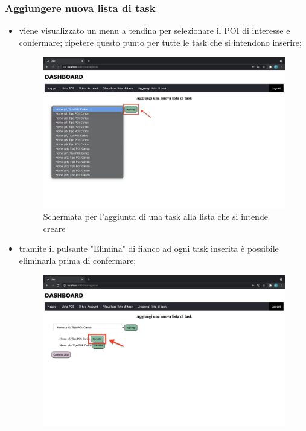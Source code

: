\subsubsection{Aggiungere nuova lista di task}
\begin{itemize}
    \item viene visualizzato un menu a tendina per selezionare  il POI di interesse e confermare; ripetere questo punto per tutte le task che si intendono inserire;
     \begin{figure}[H]
        \centering
        \includegraphics[scale=0.2]{res/images/aggiungitask.png}
        \caption{Schermata per l'aggiunta di una task alla lista che si intende creare}
    \end{figure}
    \item tramite il pulsante "Elimina" di fianco ad ogni task inserita è possibile eliminarla prima di confermare;
    \begin{figure}[H]
        \centering
        \includegraphics[scale=0.12]{res/images/eliminatask.png}

\end{figure}
\end{itemize}
